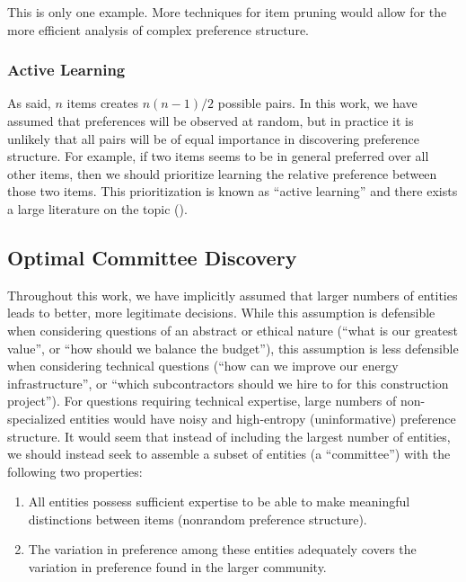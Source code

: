 This is only one example.
More techniques for item pruning would allow for the more efficient analysis of complex preference structure.

\subsubsection{Active Learning}

As said, $n$ items creates $n(n-1)/2$ possible pairs.
In this work, we have assumed that preferences will be observed at random, but in practice it is unlikely that all pairs will be of equal importance in discovering preference structure.
For example, if two items seems to be in general preferred over all other items, then we should prioritize learning the relative preference between those two items.
This prioritization is known as ``active learning'' and there exists a large literature on the topic (\cite{shahriari:2016}).

\subsection{Optimal Committee Discovery}

Throughout this work, we have implicitly assumed that larger numbers of entities leads to better, more legitimate decisions.
While this assumption is defensible when considering questions of an abstract or ethical nature (``what is our greatest value'', or ``how should we balance the budget''), this assumption is less defensible when considering technical questions (``how can we improve our energy infrastructure'', or ``which subcontractors should we hire to for this construction project'').
For questions requiring technical expertise, large numbers of non-specialized entities would have noisy and high-entropy (uninformative) preference structure.
It would seem that instead of including the largest number of entities, we should instead seek to assemble a subset of entities (a ``committee'') with the following two properties:

\begin{enumerate}
	\item All entities possess sufficient expertise to be able to make meaningful distinctions between items (nonrandom preference structure).
	\item The variation in preference among these entities adequately covers the variation in preference found in the larger community.
\end{enumerate} 

